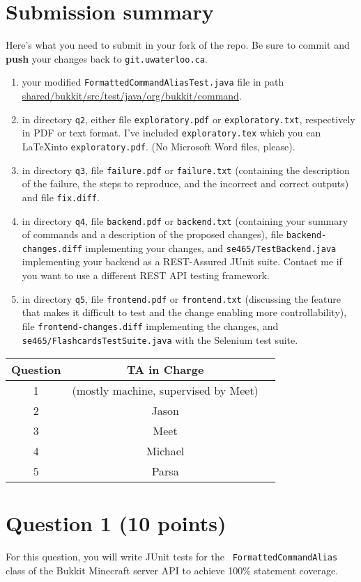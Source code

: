 \documentclass[10pt,hidelinks]{article}
\begin{document}
\section*{Submission summary}
Here's what you need to submit in your fork of the repo. Be sure to commit
and {\bf push} your changes back to {\tt git.uwaterloo.ca}.
\begin{enumerate}
\item your modified {\tt FormattedCommandAliasTest.java} file in path
\url{shared/bukkit/src/test/java/org/bukkit/command}.
\item in directory {\tt q2}, either file {\tt exploratory.pdf} or {\tt exploratory.txt}, respectively
in PDF or text format. I've included {\tt exploratory.tex} which you can
\LaTeX into {\tt exploratory.pdf}. (No Microsoft Word files, please).
\item in directory {\tt q3}, file {\tt failure.pdf} or {\tt failure.txt} (containing the description of the failure, the steps to reproduce, and the incorrect and correct outputs) and file {\tt fix.diff}.
\item in directory {\tt q4}, file {\tt backend.pdf} or {\tt backend.txt} (containing your summary of commands and a description of the proposed changes), file {\tt backend-changes.diff} implementing your changes, and {\tt se465/TestBackend.java} implementing your backend as a REST-Assured JUnit suite. Contact me if you want to use a different REST API testing framework.
\item in directory {\tt q5}, file {\tt frontend.pdf} or {\tt frontend.txt} (discussing the feature that makes it difficult to test and the change enabling more controllability), file {\tt frontend-changes.diff} implementing the changes, and {\tt se465/FlashcardsTestSuite.java} with the Selenium test suite.
\end{enumerate}
 
 \begin{center}
 \begin{tabular}{c|cc}
 Question   &  TA in Charge \\ \hline
1 & (mostly machine, supervised by Meet) \\ 
2 & Jason \\ 
3 & Meet \\ 
4 & Michael \\
5 & Parsa
 \end{tabular}
 \end{center}

\newpage

\section*{Question 1 (10 points)}
For this question, you will write JUnit tests for the {\tt
  FormattedCommandAlias} class of the Bukkit Minecraft server API to
achieve 100\% statement coverage.
\end{document}
